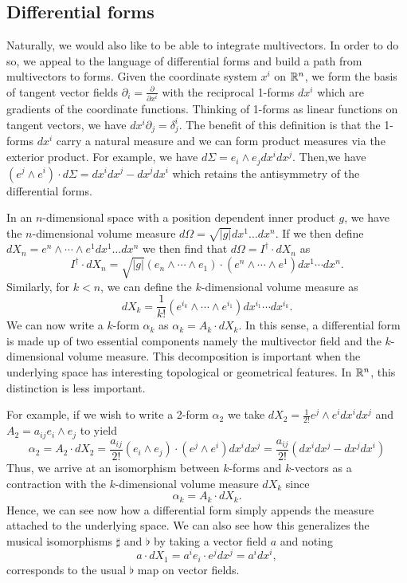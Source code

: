 \documentclass[12pt]{article}
\begin{document}
\subsection{Differential forms}

Naturally, we would also like to be able to integrate multivectors.  In order to do so, we appeal to the language of differential forms and build a path from multivectors to forms. Given the coordinate system $x^i$ on $\mathbb{R}^n$, we form the basis of tangent vector fields $\partial_i = \frac{\partial}{\partial x^i}$ with the reciprocal 1-forms $dx^i$ which are gradients of the coordinate functions.  Thinking of 1-forms as linear functions on tangent vectors, we have $dx^i  \partial_j = \delta^i_j$.  The benefit of this definition is that the 1-forms $dx^i$ carry a natural measure and we can form product measures via the exterior product.  For example, we have $d\Sigma = e_i \wedge e_j dx^i dx^j$.  Then,we have $(e^j \wedge e^i)\cdot d\Sigma = dx^idx^j - dx^j dx^i$ which retains the antisymmetry of the differential forms. 

In an $n$-dimensional space with a position dependent inner product $g$, we have the $n$-dimensional volume measure $d\Omega = \sqrt{|g|} dx^1\dots dx^n$. If we then define $dX_n = e^n \wedge \cdots \wedge e^1 dx^1 \dots dx^n$ we then find that $d\Omega = I^\dagger \cdot dX_n$ as
\[
I^\dagger \cdot dX_n = \sqrt{|g|} (e_n \wedge \cdots \wedge e_1) \cdot (e^n \wedge \cdots \wedge e^1) dx^1 \cdots dx^n.
\]
Similarly, for $k<n$, we can define the $k$-dimensional volume measure as 
\[
dX_k = \frac{1}{k!}(e^{i_k}\wedge \cdots \wedge e^{i_1}) dx^{i_1} \cdots dx^{i_k}.
\]
We can now write a $k$-form $\alpha_k$ as $\alpha_k = A_k \cdot dX_k$. In this sense, a differential form is made up of two essential components namely the multivector field and the $k$-dimensional volume measure.  This decomposition is important when the underlying space has interesting topological or geometrical features. In $\mathbb{R}^n$, this distinction is less important. 

For example, if we wish to write a 2-form $\alpha_2$ we take $dX_2 = \frac{1}{2!} e^j \wedge e^i dx^i dx^j$ and $A_2 = a_{ij} e_i \wedge e_j$ to yield
\[
\alpha_2 = A_2 \cdot dX_2 = \frac{a_{ij}}{2!} (e_i \wedge e_j) \cdot (e^j \wedge e^i) dx^i dx^j = \frac{a_{ij}}{2!} (dx^i dx^j - dx^j dx^i)
\]
Thus, we arrive at an isomorphism between $k$-forms and $k$-vectors as a contraction with the $k$-dimensional volume measure $dX_k$ since
\[
\alpha_k = A_k \cdot dX_k.
\]
Hence, we can see now how a differential form simply appends the measure attached to the underlying space. We can also see how this generalizes the musical isomorphisms $\sharp$ and $\flat$ by taking a vector field $a$ and noting
\begin{equation}
\label{eq:line_element}
a \cdot dX_1 = a^i e_i \cdot e^j dx^j = a^i dx^i,
\end{equation}
corresponds to the usual $\flat$ map on vector fields.
\end{document}
